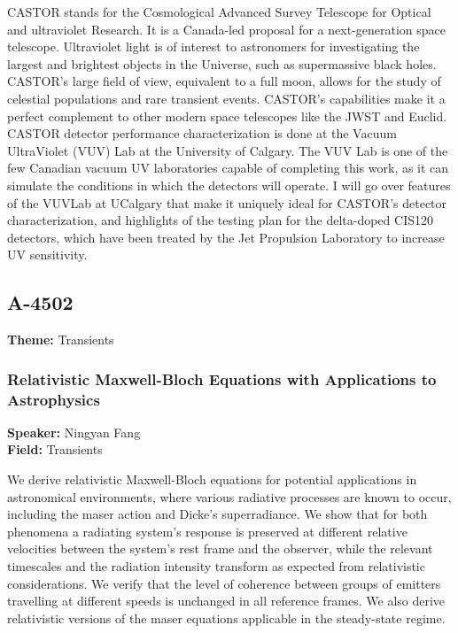 CASTOR stands for the Cosmological Advanced Survey Telescope for Optical and ultraviolet Research. It is a Canada-led proposal for a next-generation space telescope. Ultraviolet light is of interest to astronomers for investigating the largest and brightest objects in the Universe, such as supermassive black holes. CASTOR's large field of view, equivalent to a full moon, allows for the study of celestial populations and rare transient events. CASTOR's capabilities make it a perfect complement to other modern space telescopes like the JWST and Euclid. CASTOR detector performance characterization is done at the Vacuum UltraViolet (VUV) Lab at the University of Calgary. The VUV Lab is one of the few Canadian vacuum UV laboratories capable of completing this work, as it can simulate the conditions in which the detectors will operate. I will go over features of the VUVLab at UCalgary that make it uniquely ideal for CASTOR's detector characterization, and highlights of the testing plan for the delta-doped CIS120 detectors, which have been treated by the Jet Propulsion Laboratory to increase UV sensitivity.

\subsection*{A-4502}
\textbf{Theme:} Transients

\hypertarget{abstract-talk-161}{}\label{abstract-page-talk-161}
\subsubsection*{Relativistic Maxwell-Bloch Equations with Applications to Astrophysics}
\textbf{Speaker:} Ningyan Fang\\
\textbf{Field:} Transients

We derive relativistic Maxwell-Bloch equations for potential applications in astronomical environments, where various radiative processes are known to occur, including the maser action and Dicke's superradiance. We show that for both phenomena a radiating system's response is preserved at different relative velocities between the system's rest frame and the observer, while the relevant timescales and the radiation intensity transform as expected from relativistic considerations. We verify that the level of coherence between groups of emitters travelling at different speeds is unchanged in all reference frames. We also derive relativistic versions of the maser equations applicable in the steady-state regime.


